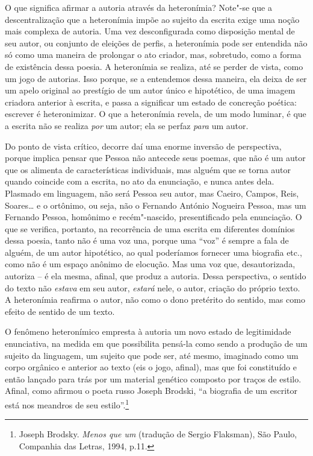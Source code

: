 O que significa afirmar a autoria através da heteronímia? Note"-se que a
descentralização que a heteronímia impõe ao sujeito da escrita exige uma
noção mais complexa de autoria. Uma vez desconfigurada como disposição
mental de seu autor, ou conjunto de eleições de perfis, a heteronímia
pode ser entendida não só como uma maneira de prolongar o ato criador,
mas, sobretudo, como a forma de existência dessa poesia. A heteronímia
se realiza, até se perder de vista, como um jogo de autorias. Isso
porque, se a entendemos dessa maneira, ela deixa de ser um apelo
original ao prestígio de um autor único e hipotético, de uma imagem
criadora anterior à escrita, e passa a significar um estado de concreção
poética: escrever é heteronimizar. O que a heteronímia revela, de um
modo luminar, é que a escrita não se realiza \emph{por} um autor; ela se
perfaz \emph{para} um autor.

Do ponto de vista crítico, decorre daí uma enorme inversão de
perspectiva, porque implica pensar que Pessoa não antecede seus poemas,
que não é um autor que os alimenta de características individuais, mas
alguém que se torna autor quando coincide com a escrita, no ato da
enunciação, e nunca antes dela. Plasmado em linguagem, não será Pessoa
seu autor, mas Caeiro, Campos, Reis, Soares\ldots{} e o ortônimo, ou seja,
não o Fernando António Nogueira Pessoa, mas um Fernando Pessoa, homônimo
e recém"-nascido, presentificado pela enunciação. O que se verifica,
portanto, na recorrência de uma escrita em diferentes domínios dessa
poesia, tanto não é uma voz una, porque uma ``voz'' é sempre a fala de
alguém, de um autor hipotético, ao qual poderíamos fornecer uma
biografia etc., como não é um espaço anônimo de elocução. Mas uma voz
que, desautorizada, autoriza -- é ela mesma, afinal, que produz a
autoria. Dessa perspectiva, o sentido do texto não \emph{estava} em seu
autor, \emph{estará} nele, o autor, criação do próprio texto. A
heteronímia reafirma o autor, não como o dono pretérito do sentido, mas
como efeito de sentido de um texto.

O fenômeno heteronímico empresta à autoria um novo estado de
legitimidade enunciativa, na medida em que possibilita pensá-la como
sendo a produção de um sujeito da linguagem, um sujeito que pode ser,
até mesmo, imaginado como um corpo orgânico e anterior ao texto (eis o
jogo, afinal), mas que foi constituído e então lançado para trás por um
material genético composto por traços de estilo. Afinal, como afirmou o
poeta russo Joseph Brodski, ``a biografia de um escritor está nos
meandros de seu estilo''.\footnote{Joseph Brodsky. \emph{Menos que um}
  (tradução de Sergio Flaksman), São Paulo, Companhia das Letras, 1994,
  p.11.}

